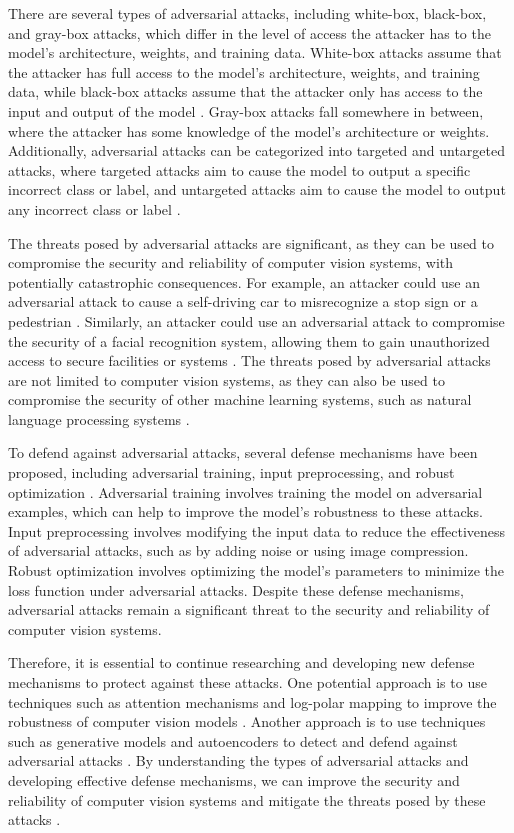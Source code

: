 \documentclass[11pt]{article}
\begin{document}
There are several types of adversarial attacks, including white-box, black-box, and gray-box attacks, which differ in the level of access the attacker has to the model's architecture, weights, and training data. White-box attacks assume that the attacker has full access to the model's architecture, weights, and training data, while black-box attacks assume that the attacker only has access to the input and output of the model \cite{ref34}. Gray-box attacks fall somewhere in between, where the attacker has some knowledge of the model's architecture or weights. Additionally, adversarial attacks can be categorized into targeted and untargeted attacks, where targeted attacks aim to cause the model to output a specific incorrect class or label, and untargeted attacks aim to cause the model to output any incorrect class or label \cite{ref35}.

The threats posed by adversarial attacks are significant, as they can be used to compromise the security and reliability of computer vision systems, with potentially catastrophic consequences. For example, an attacker could use an adversarial attack to cause a self-driving car to misrecognize a stop sign or a pedestrian \cite{ref5}. Similarly, an attacker could use an adversarial attack to compromise the security of a facial recognition system, allowing them to gain unauthorized access to secure facilities or systems \cite{ref36}. The threats posed by adversarial attacks are not limited to computer vision systems, as they can also be used to compromise the security of other machine learning systems, such as natural language processing systems \cite{ref37}.

To defend against adversarial attacks, several defense mechanisms have been proposed, including adversarial training, input preprocessing, and robust optimization \cite{ref6}. Adversarial training involves training the model on adversarial examples, which can help to improve the model's robustness to these attacks. Input preprocessing involves modifying the input data to reduce the effectiveness of adversarial attacks, such as by adding noise or using image compression. Robust optimization involves optimizing the model's parameters to minimize the loss function under adversarial attacks. Despite these defense mechanisms, adversarial attacks remain a significant threat to the security and reliability of computer vision systems.

Therefore, it is essential to continue researching and developing new defense mechanisms to protect against these attacks. One potential approach is to use techniques such as attention mechanisms and log-polar mapping to improve the robustness of computer vision models \cite{ref38}. Another approach is to use techniques such as generative models and autoencoders to detect and defend against adversarial attacks \cite{ref26}. By understanding the types of adversarial attacks and developing effective defense mechanisms, we can improve the security and reliability of computer vision systems and mitigate the threats posed by these attacks \cite{ref39}.
\end{document}
